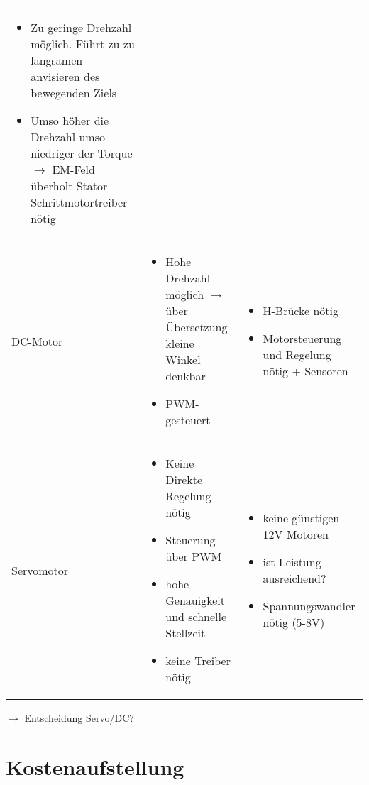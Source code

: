 \begin{longtable}{ p{}|p{}|p{} }
\begin{itemize}
	\item Zu geringe Drehzahl möglich. Führt zu zu langsamen anvisieren des bewegenden Ziels
	\item Umso höher die Drehzahl umso niedriger der Torque $\rightarrow$ EM-Feld überholt Stator Schrittmotortreiber nötig
    \end{itemize}
\\
    DC-Motor &
    \begin{itemize}
        \item Hohe Drehzahl möglich $\rightarrow$ über Übersetzung kleine Winkel denkbar
        \item PWM-gesteuert
    \end{itemize}
    &
    \begin{itemize}
        \item H-Brücke nötig
        \item Motorsteuerung und Regelung nötig + Sensoren
    \end{itemize}
    \\
    Servomotor &
    \begin{itemize}
        \item Keine Direkte Regelung nötig
        \item Steuerung über PWM
        \item hohe Genauigkeit und schnelle Stellzeit
        \item keine Treiber nötig
    \end{itemize}
    &
    \begin{itemize}
        \item keine günstigen 12V Motoren
        \item ist Leistung ausreichend?
        \item Spannungswandler nötig (5-8V)
    \end{itemize}
    \\
\end{longtable}

$\rightarrow$ Entscheidung Servo/DC?


\section{Kostenaufstellung}

